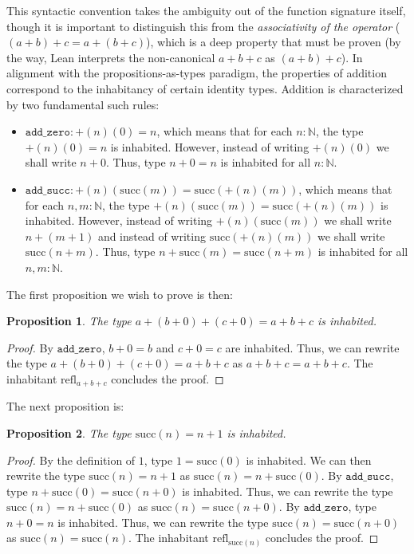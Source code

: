 \documentclass[12pt]{article}
\newtheorem{proposition}{Proposition}[section]
\theoremstyle{definition}
\theoremstyle{remark}
\begin{document}
This syntactic convention takes the ambiguity out of the function signature itself, though it is important to distinguish this from the \textit{associativity of the operator} ($(a+b)+c = a+(b+c)$), which is a deep property that must be proven (by the way, Lean interprets the non-canonical $a+b+c$ as $(a+b)+c$). In alignment with the propositions-as-types paradigm, the properties of addition correspond to the inhabitancy of certain identity types. Addition is characterized by two fundamental such rules:
\begin{itemize}
  \item $\texttt{add\_zero}: +(n)(0) = n$, which means that for each $n : \mathbb{N}$, the type $+(n)(0) = n$ is inhabited. However, instead of writing $+(n)(0)$ we shall write $n+0$. Thus, type $n+0 = n$ is inhabited for all $n : \mathbb{N}$.
  \item $\texttt{add\_succ}: +(n)(\text{succ}(m)) = \text{succ}(+(n)(m))$, which means that for each $n, m : \mathbb{N}$, the type $+(n)(\text{succ}(m)) = \text{succ}(+(n)(m))$ is inhabited. However, instead of writing $+(n)(\text{succ}(m))$ we shall write $n+(m+1)$ and instead of writing $\text{succ}(+(n)(m))$ we shall write $\text{succ}(n+m)$. Thus, type $n+\text{succ}(m) = \text{succ}(n+m)$ is inhabited for all $n, m : \mathbb{N}$.
\end{itemize}

The first proposition we wish to prove is then:

\begin{proposition}
  The type $a+(b+0)+(c+0) = a+b+c$ is inhabited.
\end{proposition}
\begin{proof}
  By $\texttt{add\_zero}$, $b+0 = b$ and $c+0 = c$ are inhabited. Thus, we can rewrite the type $a+(b+0)+(c+0) = a+b+c$ as $a+b+c = a+b+c$.
  The inhabitant $\text{refl}_{a+b+c}$ concludes the proof.
\end{proof}

The next proposition is:
\begin{proposition}
  The type $\text{succ}(n) = n+1$ is inhabited.
\end{proposition}
\begin{proof}
  By the definition of $1$, type $1 = \text{succ}(0)$ is inhabited. We can then rewrite the type $\text{succ}(n) = n+1$ as $\text{succ}(n) = n+\text{succ}(0)$. By $\texttt{add\_succ}$, type $n+\text{succ}(0) = \text{succ}(n+0)$ is inhabited. Thus, we can rewrite the type $\text{succ}(n) = n+\text{succ}(0)$ as $\text{succ}(n) = \text{succ}(n+0)$. By $\texttt{add\_zero}$, type $n+0 = n$ is inhabited. Thus, we can rewrite the type $\text{succ}(n) = \text{succ}(n+0)$ as $\text{succ}(n) = \text{succ}(n)$.
  The inhabitant $\text{refl}_{\text{succ}(n)}$ concludes the proof.
\end{proof}
\end{document}
